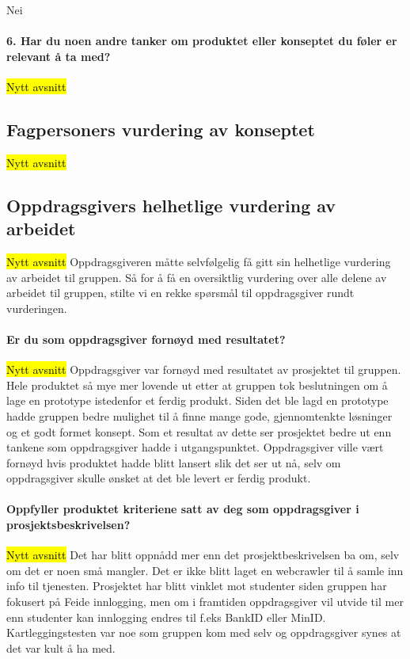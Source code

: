 Nei

\paragraph{6. Har du noen andre tanker om produktet eller konseptet du føler er relevant å ta med?}
\hl{Nytt avsnitt}


\subsection{Fagpersoners vurdering av konseptet}
\hl{Nytt avsnitt}

\subsection{Oppdragsgivers helhetlige vurdering av arbeidet}
\hl{Nytt avsnitt}
Oppdragsgiveren måtte selvfølgelig få gitt sin helhetlige vurdering av arbeidet til gruppen. Så for å få en oversiktlig vurdering over alle delene av arbeidet til gruppen, stilte vi en rekke spørsmål til oppdragsgiver rundt vurderingen. 

\paragraph{Er du som oppdragsgiver fornøyd med resultatet?}
\hl{Nytt avsnitt}
Oppdragsgiver var fornøyd med resultatet av prosjektet til gruppen. Hele produktet så mye mer lovende ut etter at gruppen tok beslutningen om å lage en prototype istedenfor et ferdig produkt. Siden det ble lagd en prototype hadde gruppen bedre mulighet til å finne mange gode, gjennomtenkte løsninger og et godt formet konsept. Som et resultat av dette ser prosjektet bedre ut enn tankene som oppdragsgiver hadde i utgangspunktet. Oppdragsgiver ville vært fornøyd hvis produktet hadde blitt lansert slik det ser ut nå, selv om oppdragsgiver skulle ønsket at det ble levert er ferdig produkt.

\paragraph{Oppfyller produktet kriteriene satt av deg som oppdragsgiver i prosjektsbeskrivelsen?}
\hl{Nytt avsnitt}
Det har blitt oppnådd mer enn det prosjektbeskrivelsen ba om, selv om det er noen små mangler. Det er ikke blitt laget en webcrawler til å samle inn info til tjenesten. Prosjektet har blitt vinklet mot studenter siden gruppen har fokusert på Feide innlogging, men om i framtiden oppdragsgiver vil utvide til mer enn studenter kan innlogging endres til f.eks BankID eller MinID. Kartleggingstesten var noe som gruppen kom med selv og oppdragsgiver synes at det var kult å ha med. 


